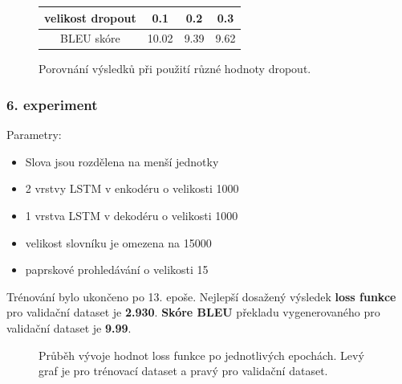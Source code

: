 \begin{figure}[H]
    \begin{center}
        \begin{tabular}{c|c|c|c}
          velikost dropout & 0.1 & 0.2 & 0.3 \\
          \hline
          BLEU skóre & 10.02 & 9.39 & 9.62 \\
          \hline
        \end{tabular}
    \end{center}
	\caption{Porovnání výsledků při použití různé hodnoty dropout.}
	\label{table:resultsExperiment5}
\end{figure}

\subsubsection{6. experiment}\label{experiment6}
Parametry:
\begin{itemize}
  \item Slova jsou rozdělena na menší jednotky
  \item 2 vrstvy LSTM v enkodéru o velikosti 1000
  \item 1 vrstva LSTM v dekodéru o velikosti 1000
  \item velikost slovníku je omezena na 15000
  \item paprskové prohledávání o velikosti 15
\end{itemize}

Trénování bylo ukončeno po 13. epoše. Nejlepší dosažený výsledek \textbf{loss funkce} pro validační dataset je \textbf{2.930}. \textbf{Skóre BLEU} překladu vygenerovaného pro validační dataset je \textbf{9.99}.

\begin{figure}[H]
    \begin{center}
    \end{center}
	\caption{Průběh vývoje hodnot loss funkce po jednotlivých epochách. Levý graf je pro trénovací dataset a pravý pro validační dataset.}
\end{figure}


